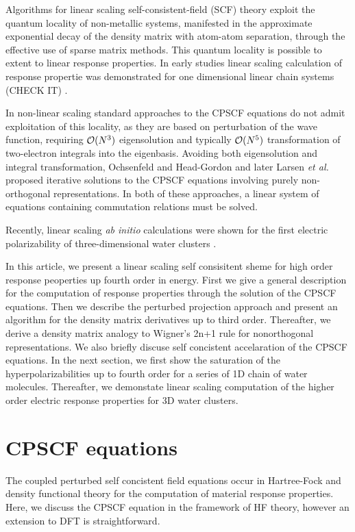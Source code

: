 \documentclass[twocolumn,showpacs,preprintnumbers,amsmath,amssymb]{revtex4}
\begin{document}
 Algorithms for linear scaling self-consistent-field (SCF) theory 
 exploit the quantum locality of non-metallic systems, manifested
 in the approximate exponential decay of the density matrix 
 with atom-atom separation, through the effective use of sparse 
 matrix methods. This quantum locality is possible
 to extent to linear response 
 properties. In early studies linear scaling calculation of
 response propertie was demonstrated for one 
 dimensional linear chain systems (CHECK IT)
 \cite{Ochsenfeld_1997,Ochsenfeld_1998,chintoc}.


 In non-linear scaling standard approaches to the CPSCF equations 
 \cite{Pople_1979,Sekino_1986,Dupuis_1991} do not admit exploitation 
 of this locality, as they are based on perturbation of the wave
 function, requiring ${\cal O}(N^3)$ eigensolution 
 and typically ${\cal O}(N^5)$ transformation of two-electron 
 integrals into the eigenbasis. Avoiding both 
 eigensolution and integral transformation, Ochsenfeld and Head-Gordon
 \cite{Ochsenfeld_1997} and later Larsen {\em et al.}
 \cite{Helgaker_2001} proposed iterative solutions to the 
 CPSCF equations involving purely non-orthogonal representations.  
 In both of these approaches, a linear system of equations 
 containing commutation relations must be solved.


 Recently, linear scaling {\em ab initio} calculations were shown
 for the first electric polarizability of three-dimensional water
 clusters \cite{Weber_Niklasson_Challacombe_2004}.


 In this article, we present a linear scaling self consisitent sheme
 for high order response peoperties up fourth order in energy.
 First we give a general description for the computation of 
 response properties through the solution of the CPSCF equations.
 Then we describe the perturbed projection approach and present
 an algorithm for the density matrix derivatives up to third order.
 Thereafter, we derive a density matrix analogy to Wigner's 2n+1
 rule for nonorthogonal representations. We also briefly discuse
 self concistent accelaration of the CPSCF equations. In the next section,
 we first show the saturation of the hyperpolarizabilities up to fourth order
 for a series of 1D chain of water molecules. Thereafter, we demonstate
 linear scaling computation of the higher order electric response properties
 for 3D water clusters.


\section{CPSCF equations}
 The coupled perturbed self concistent field equations occur in Hartree-Fock
 and density functional theory for the computation of material response
 properties. Here, we discuss the CPSCF equation in the framework of
 HF theory, however an extension to DFT is straightforward.
\end{document}

